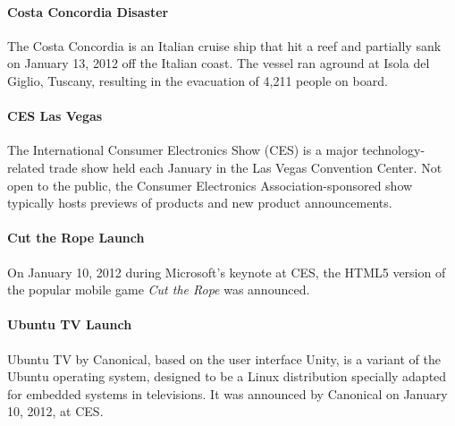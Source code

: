 \documentclass{acm_proc_article-sp}
\newcommand{\inlinelistingsize}{\fontsize{8pt}{11pt}}
\let\oldurl\url
\renewcommand{\url}[1]{\inlinelistingsize\oldurl{#1}}
\begin{document}
\paragraph{Costa Concordia Disaster} \label{sec:concordia}
The Costa Concordia is an Italian cruise ship that hit a reef and partially sank on January 13, 2012 off the Italian coast.
The vessel ran aground at Isola del Giglio, Tuscany, resulting in the evacuation of 4,211 people on board.

\paragraph{CES Las Vegas}
The International Consumer Electronics Show (CES) is a major technology-related trade show held each January in the Las Vegas Convention Center.
Not open to the public, the Consumer Electronics Association-sponsored show typically hosts previews of products and new product announcements.

\paragraph{Cut the Rope Launch}
On January 10, 2012 during Microsoft's keynote at CES, the HTML5 version of the popular mobile game \textit{Cut the Rope} was announced.

\paragraph{Ubuntu TV Launch}
Ubuntu TV by Canonical, based on the user interface Unity, is a variant of the Ubuntu operating system, designed to be a Linux distribution specially adapted for embedded systems in televisions. It was announced by Canonical on January 10, 2012, at CES.
\end{document}
